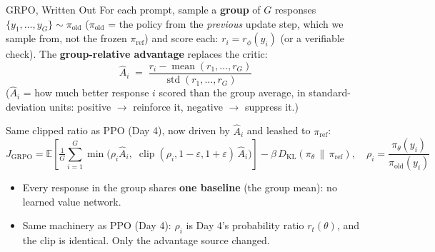 \begin{frame}[allowframebreaks]{GRPO, Written Out}
For each prompt, sample a \textbf{group} of $G$ responses
$\{y_1, \dots, y_G\}\sim\pi_{\text{old}}$ ($\pi_{\text{old}}$ = the policy from the
\emph{previous} update step, which we sample from, not the frozen
$\pi_{\text{ref}}$) and score each: $r_i = r_\phi(y_i)$ (or a verifiable check). The
\textbf{group-relative advantage} replaces the critic:
\[
    \hat{A}_i \;=\; \frac{r_i - \operatorname{mean}(r_1, \dots, r_G)}
                          {\operatorname{std}(r_1, \dots, r_G)}
\]
($\hat{A}_i$ = how much better response $i$ scored than the group average, in
standard-deviation units: positive $\to$ reinforce it, negative $\to$ suppress it.)
\vspace{0.2em}

\framebreak

Same clipped ratio as PPO (Day 4), now driven by $\hat{A}_i$ and leashed to
$\pi_{\text{ref}}$:
\[
    J_{\mathrm{GRPO}} =
    \mathbb{E}\!\left[ \tfrac{1}{G}\sum_{i=1}^{G}
        \min\!\big(\rho_i \hat{A}_i, \;
        \operatorname{clip}(\rho_i, 1{-}\varepsilon, 1{+}\varepsilon)\, \hat{A}_i\big)
    \right]
    - \beta\, D_{\mathrm{KL}}\!\left(\pi_\theta \, \|\, \pi_{\text{ref}}\right),
    \quad \rho_i = \frac{\pi_\theta(y_i)}{\pi_{\text{old}}(y_i)}
\]
\begin{itemize}\itemsep0.15em\small
    \item Every response in the group shares \textbf{one baseline} (the group mean):
          no learned value network.
    \item Same machinery as PPO (Day 4): $\rho_i$ is Day 4's probability ratio
          $r_t(\theta)$, and the clip is identical. Only the advantage source changed.
\end{itemize}
\end{frame}

